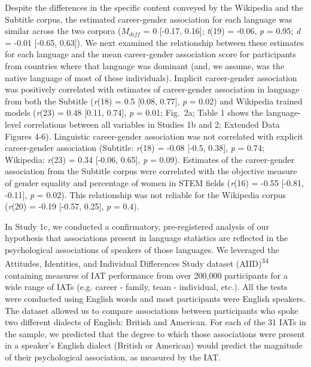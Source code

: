 \documentclass[11pt]{wlscirep}
\begin{document}
Despite the differences in the specific content conveyed by the
Wikipedia and the Subtitle corpus, the estimated career-gender association for each
language was similar across the two corpora ($M_{diff}$ = 0 {[}-0.17, 0.16{]}; \emph{t}(19) = -0.06, \emph{p} = 0.95; \emph{d} = -0.01 {[}-0.65, 0.63{]}). We next examined the relationship between these
estimates for each language and the mean career-gender association score
for participants from countries where that language was dominant (and,
we assume, was the native language of most of these individuals).
Implicit career-gender association was positively correlated with estimates of
 career-gender association in language from both the Subtitle (\emph{r}(18) = 0.5 {[}0.08, 0.77{]}, \emph{p} = 0.02)
and Wikipedia trained models (\emph{r}(23) = 0.48 {[}0.11, 0.74{]}, \emph{p} = 0.01; Fig.\ 2a;
Table 1 shows the language-level correlations between all variables in
Studies 1b and 2;  Extended Data Figures 4-6). Linguistic career-gender association was
not correlated with explicit career-gender association (Subtitle: \emph{r}(18) = -0.08 {[}-0.5, 0.38{]}, \emph{p} = 0.74; Wikipedia: \emph{r}(23) = 0.34 {[}-0.06, 0.65{]}, \emph{p} = 0.09). Estimates
of the career-gender association from the Subtitle corpus were correlated with the
objective measure of gender equality and percentage of women in STEM fields
(\emph{r}(16) = -0.55 {[}-0.81, -0.11{]}, \emph{p} = 0.02). This relationship was not reliable
for the Wikipedia corpus (\emph{r}(20) = -0.19 {[}-0.57, 0.25{]}, \emph{p} = 0.4). 




In Study 1c, we conducted a confirmatory, pre-registered analysis of our hypothesis that associations present in language statistics are reflected in the psychological associations of speakers of those languages. We leveraged the Attitudes, Identities, and Individual Differences Study dataset (AIID)\textsuperscript{34} containing measures of IAT performance from over 200,000 participants for a wide range of IATs (e.g. career - family, team - individual, etc.). All the tests were conducted using English words and most participants were English speakers. The dataset allowed us to compare associations between participants who spoke two different dialects of English: British and American. For each of the 31 IATs in the sample, we predicted that the degree to which those associations were present in a speaker’s English dialect (British or American) would predict the magnitude of their psychological association, as measured by the IAT.
\end{document}
